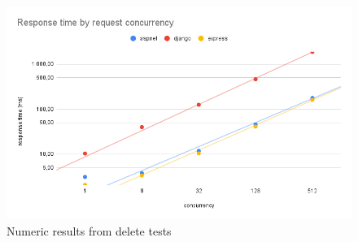 \begin{figure}[H]
    \includegraphics[width=\columnwidth]{figures/pictures/resultsDelete.png}
    \caption{Numeric results from delete tests}
    \label{fig:resultsDelete}
\end{figure}
